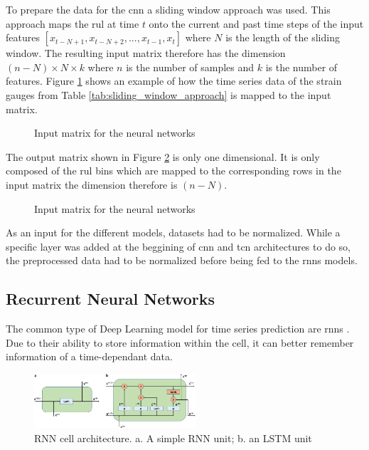 \documentclass[conference]{IEEEtran}
\begin{document}
To prepare the data for the \gls{cnn} a sliding window approach was used. This approach maps the \gls{rul} at time $ t $ onto the current and past time steps of the input features $ [x_{t-N+1}, x_{t-N+2},..., x_{t-1}, x_t] $ where $ N $ is the length of the sliding window. The resulting input matrix therefore has the dimension $ (n-N) \times N \times k $ where $ n $ is the number of samples and $ k $ is the number of features. Figure \ref{fig:input_matrix} shows an example of how the time series data of the strain gauges from Table \ref{tab:sliding_window_approach} is mapped to the input matrix.

\begin{figure}[htp]
	\centering
	
	\caption{Input matrix for the neural networks}
	\label{fig:input_matrix}
\end{figure}

The output matrix shown in Figure \ref{fig:output_matrix} is only one dimensional. It is only composed of the \gls{rul} bins which are mapped to the corresponding rows in the input matrix the dimension therefore is $ (n-N) $.

\begin{figure}[htp]
	\centering
	
	\caption{Input matrix for the neural networks}
	\label{fig:output_matrix}
\end{figure}

As an input for the different models, datasets had to be normalized. While a specific layer was added at the beggining of \gls{cnn} and \gls{tcn} architectures to do so, the preprocessed data had to be normalized before being fed to the \glspl{rnn} models.


\noindent
\subsection{Recurrent Neural Networks}

The common type of Deep Learning model for time series prediction are \glspl{rnn} \cite{Bai2018}. Due to their ability to store information within the cell, it can better remember information of a time-dependant data. 


\begin{figure}[htp]
	\centering
	\includegraphics[width=6cm]{RNN-cell-architecture.png}
	\caption{RNN cell architecture. a. A simple RNN unit; b. an LSTM unit \cite{Chen2021}}
	\label{fig:RNN-classification}
\end{figure}
\end{document}
